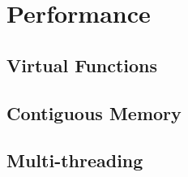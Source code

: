 \section{Performance}

\subsection{Virtual Functions}

\subsection{Contiguous Memory}

\subsection{Multi-threading}
